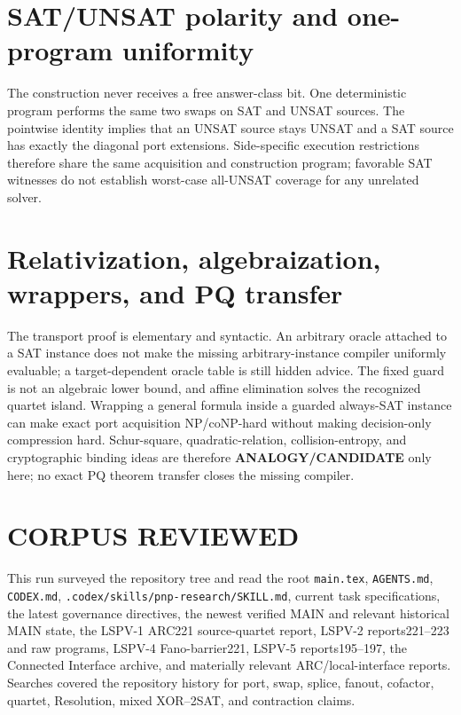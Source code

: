 \documentclass[11pt]{article}
\begin{document}
\section{SAT/UNSAT polarity and one-program uniformity}
The construction never receives a free answer-class bit.  One deterministic
program performs the same two swaps on SAT and UNSAT sources.  The pointwise
identity implies that an UNSAT source stays UNSAT and a SAT source has exactly
the diagonal port extensions.  Side-specific execution restrictions therefore
share the same acquisition and construction program; favorable SAT witnesses
do not establish worst-case all-UNSAT coverage for any unrelated solver.

\section{Relativization, algebraization, wrappers, and PQ transfer}
The transport proof is elementary and syntactic.  An arbitrary oracle attached
to a SAT instance does not make the missing arbitrary-instance compiler
uniformly evaluable; a target-dependent oracle table is still hidden advice.
The fixed guard is not an algebraic lower bound, and affine elimination solves
the recognized quartet island.  Wrapping a general formula inside a guarded
always-SAT instance can make exact port acquisition NP/coNP-hard without
making decision-only compression hard.  Schur-square, quadratic-relation,
collision-entropy, and cryptographic binding ideas are therefore
\textbf{ANALOGY/CANDIDATE} only here; no exact PQ theorem transfer closes the
missing compiler.

\section{CORPUS REVIEWED}
This run surveyed the repository tree and read the root
\texttt{main.tex}, \texttt{AGENTS.md}, \texttt{CODEX.md},
\texttt{.codex/skills/pnp-research/SKILL.md}, current task specifications,
the latest governance directives, the newest verified MAIN and relevant
historical MAIN state, the LSPV-1 ARC221 source-quartet report, LSPV-2
reports221--223 and raw programs, LSPV-4 Fano-barrier221, LSPV-5
reports195--197, the Connected Interface archive, and materially relevant
ARC/local-interface reports.  Searches covered the repository history for
port, swap, splice, fanout, cofactor, quartet, Resolution, mixed XOR--2SAT,
and contraction claims.
\end{document}
